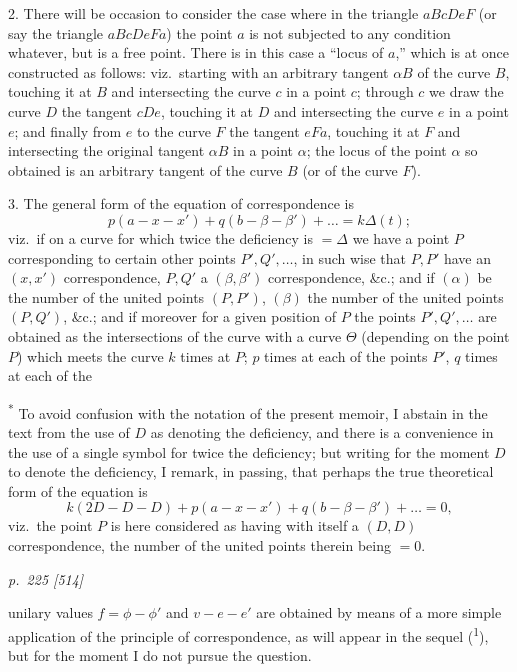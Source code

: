 \documentclass[11pt,a4paper]{book}
\begin{document}
2. There will be occasion to consider the case where in the triangle $aBcDeF$ (or
say the triangle $aBcDeFa$) the point $a$ is not subjected to any condition whatever,
but is a free point.  There is in this case a ``locus of $a$,'' which is at once constructed as follows: viz.\ starting with an arbitrary tangent $\alpha B$ of the curve $B$,
touching it at $B$ and intersecting the curve $c$ in a point $c$; through $c$ we draw
the curve $D$ the tangent $cDe$, touching it at $D$ and intersecting the curve $e$ in a
point $e$; and finally from $e$ to the curve $F$ the tangent $eFa$, touching it at $F$ and
intersecting the original tangent $\alpha B$ in a point $\alpha$; the locus of the point $\alpha$ so
obtained is an arbitrary tangent of the curve $B$ (or of the curve $F$).

3. The general form of the equation of correspondence is
\[
p(a-x-x')+q(b-\beta-\beta')+ \ldots = k\Delta(t);
\]
viz.\ if on a curve for which twice the deficiency is $=\Delta$ we have a point $P$ corresponding to certain other points $P', Q', \ldots$, in such wise that $P, P'$ have an $(x, x')$
correspondence, $P, Q'$ a $(\beta, \beta')$ correspondence, \&c.; and if $(\alpha)$ be the number of the
united points $(P, P')$, $(\beta)$ the number of the united points $(P, Q')$, \&c.; and if moreover for a given position of $P$ the points $P', Q', \ldots$ are obtained as the
intersections of the curve with a curve $\Theta$ (depending on the point $P$) which meets
the curve $k$ times at $P$; $p$ times at each of the points $P'$, $q$ times at each of the

\bigskip
\noindent\textsuperscript{*} To avoid confusion with the notation of the present memoir, I abstain in the text from the use of $D$
as denoting the deficiency, and there is a convenience in the use of a single symbol for twice the deficiency;
but writing for the moment $D$ to denote the deficiency, I remark, in passing, that perhaps the true theoretical
form of the equation is
\[
k(2D-D-D)+p(a-x-x')+q(b-\beta-\beta')+\ldots = 0,
\]
viz.\ the point $P$ is here considered as having with itself a $(D, D)$ correspondence, the number of the united
points therein being $=0$.

\clearpage

\bigskip
\textit{p.~225 [514]}
\smallskip

unilary values $f=\phi-\phi'$ and $v-e-e'$ are obtained by means of a more simple
application of the principle of correspondence, as will appear in the sequel (\textsuperscript{1}), but for
the moment I do not pursue the question.
\end{document}
